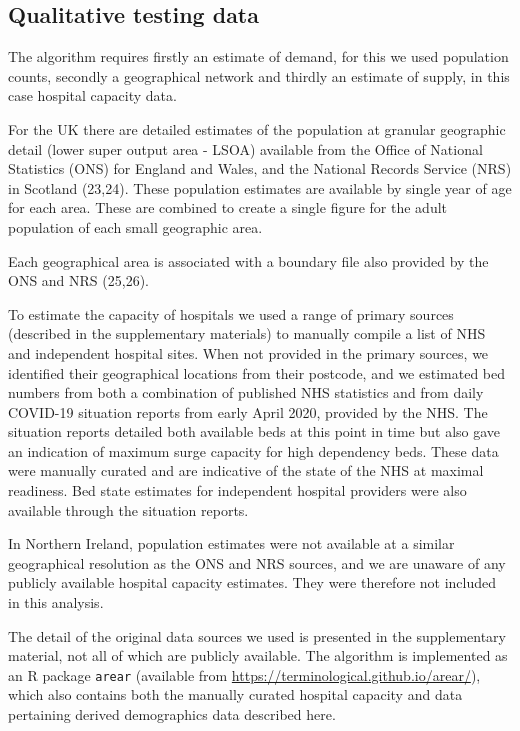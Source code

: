 \documentclass[
]{article}
\begin{document}
\hypertarget{qualitative-testing-data}{%
\subsection{Qualitative testing data}\label{qualitative-testing-data}}

The algorithm requires firstly an estimate of demand, for this we used
population counts, secondly a geographical network and thirdly an
estimate of supply, in this case hospital capacity data.

For the UK there are detailed estimates of the population at granular
geographic detail (lower super output area - LSOA) available from the
Office of National Statistics (ONS) for England and Wales, and the
National Records Service (NRS) in Scotland (23,24). These population
estimates are available by single year of age for each area. These are
combined to create a single figure for the adult population of each
small geographic area.

Each geographical area is associated with a boundary file also provided
by the ONS and NRS (25,26).

To estimate the capacity of hospitals we used a range of primary sources
(described in the supplementary materials) to manually compile a list of
NHS and independent hospital sites. When not provided in the primary
sources, we identified their geographical locations from their postcode,
and we estimated bed numbers from both a combination of published NHS
statistics and from daily COVID-19 situation reports from early April
2020, provided by the NHS. The situation reports detailed both available
beds at this point in time but also gave an indication of maximum surge
capacity for high dependency beds. These data were manually curated and
are indicative of the state of the NHS at maximal readiness. Bed state
estimates for independent hospital providers were also available through
the situation reports.

In Northern Ireland, population estimates were not available at a
similar geographical resolution as the ONS and NRS sources, and we are
unaware of any publicly available hospital capacity estimates. They were
therefore not included in this analysis.

The detail of the original data sources we used is presented in the
supplementary material, not all of which are publicly available. The
algorithm is implemented as an R package \texttt{arear} (available from
\url{https://terminological.github.io/arear/}), which also contains both
the manually curated hospital capacity and data pertaining derived
demographics data described here.
\end{document}
